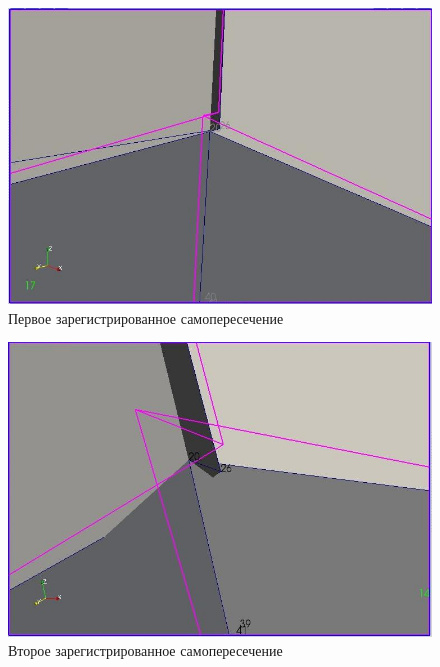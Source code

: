 \documentclass[a4paper,12pt, titlepage]{article}
\begin{document}
\begin{flushleft}
  \begin{figure}[h]
    \includegraphics[clip, width=13cm]{img/consections-1.jpeg}
    \caption{Первое зарегистрированное самопересечение}\label{consections-1}
  \end{figure}
\end{flushleft}
\begin{flushleft}
  \begin{figure}[h]
    \includegraphics[clip, width=13cm]{img/consections-2.jpeg}
    \caption{Второе зарегистрированное самопересечение}\label{consections-2}
  \end{figure}
\end{flushleft}
\end{document}
